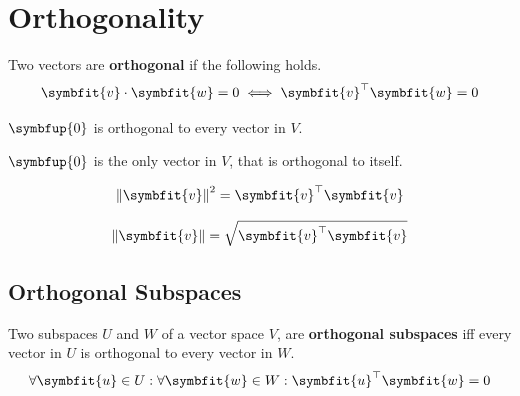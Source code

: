 \documentclass{article}
\begin{document}
\section{Orthogonality}
\begin{definition}
    Two vectors are \textbf{orthogonal} if the following holds.
    \begin{equation*}
        \symbfit{v}\cdot \symbfit{w}=0 \iff \symbfit{v}^{\top}\symbfit{w}=0
    \end{equation*}
\end{definition}
\begin{theorem}
    \(\symbfup{0}\) is orthogonal to every vector in \(V\).
\end{theorem}
\begin{theorem}
    \(\symbfup{0}\) is the only vector in \(V\), that is orthogonal to
    itself.
\end{theorem}
\begin{theorem}
    \begin{equation*}
        \norm{\symbfit{v}}^2=\symbfit{v}^{\top}\symbfit{v}
    \end{equation*}
\end{theorem}
\begin{theorem}
    \begin{equation*}
        \norm{\symbfit{v}}=\sqrt{\symbfit{v}^{\top}\symbfit{v}}
    \end{equation*}
\end{theorem}
\subsection{Orthogonal Subspaces}
\begin{definition}
    Two subspaces \(U\) and \(W\) of a vector space \(V\), are
    \textbf{orthogonal subspaces} iff every vector in \(U\) is
    orthogonal to every vector in \(W\).
    \begin{equation*}
        \forall \symbfit{u}\in U:\forall \symbfit{w}\in W:\symbfit{u}^{\top}\symbfit{w}=0
    \end{equation*}
\end{definition}
\end{document}
